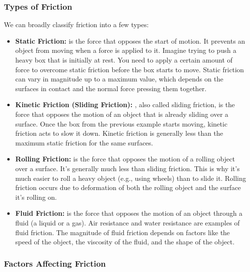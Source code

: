 \subsubsection{Types of Friction}

We can broadly classify friction into a few types:

\begin{itemize}
    \item \textbf{Static Friction:}  is the force that opposes the start of motion. It prevents an object from moving when a force is applied to it.  Imagine trying to push a heavy box that is initially at rest.  You need to apply a certain amount of force to overcome static friction before the box starts to move.  Static friction can vary in magnitude up to a maximum value, which depends on the surfaces in contact and the normal force pressing them together.

    \item \textbf{Kinetic Friction (Sliding Friction):} , also called sliding friction, is the force that opposes the motion of an object that is already sliding over a surface.  Once the box from the previous example starts moving, kinetic friction acts to slow it down.  Kinetic friction is generally less than the maximum static friction for the same surfaces.

    \item \textbf{Rolling Friction:}  is the force that opposes the motion of a rolling object over a surface.  It's generally much less than sliding friction.  This is why it's much easier to roll a heavy object (e.g., using wheels) than to slide it.  Rolling friction occurs due to deformation of both the rolling object and the surface it's rolling on.

    \item \textbf{Fluid Friction:}  is the force that opposes the motion of an object through a fluid (a liquid or a gas).  Air resistance and water resistance are examples of fluid friction. The magnitude of fluid friction depends on factors like the speed of the object, the viscosity of the fluid, and the shape of the object.
\end{itemize}

\subsubsection{Factors Affecting Friction}

